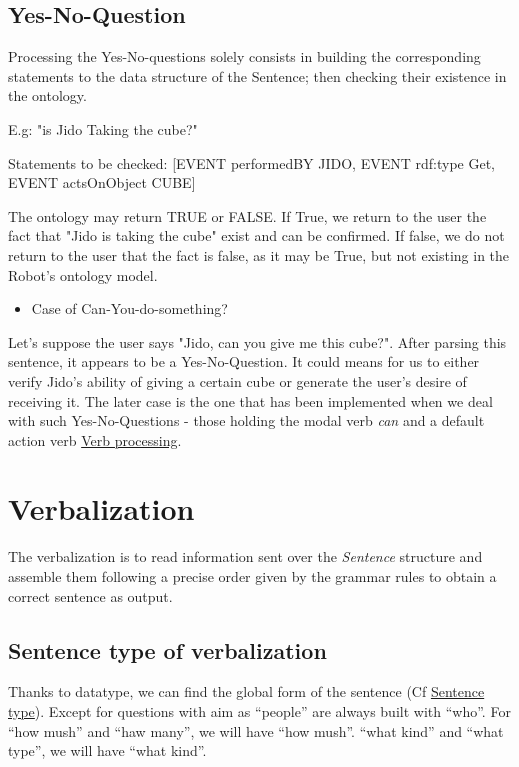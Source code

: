 \documentclass[twoside,a4paper,10pt]{report}
\begin{document}
\subsection{Yes-No-Question}
\label{e6969eb2ee1774772084bddc0430fbd3}%
Processing the Yes-No-questions solely consists in building the corresponding statements to the data structure of the Sentence;
then checking their existence in the ontology. 

E.g: "is Jido Taking the cube?"


\small
\begin{verbatimtab}
  Statements to be checked:
      [EVENT performedBY JIDO,
       EVENT rdf:type Get,
       EVENT actsOnObject CUBE]
\end{verbatimtab}
\normalsize
The ontology may return TRUE or FALSE. If True, we return to the user the fact that "Jido is taking the cube" exist and can be confirmed. If false, we do not return to the user that
the fact is false, as it may be True, but not existing in the Robot's ontology model.



\begin{itemize}
    \item  Case of Can-You-do-something?
\end{itemize}
Let's suppose the user says "Jido, can you give me this cube?". 
After parsing this sentence, it appears to be a Yes-No-Question. It could means for us to either verify Jido's ability of giving a certain cube or generate the user's desire of receiving it.
The later case is the one that has been implemented when we deal with such Yes-No-Questions - those holding the modal verb \textsl{can} and a default action verb \hyperref[d579d8cc3406c0556913bbaac7ee85e6]{Verb processing}.


\section{Verbalization}
\label{8f5fecd7d65dd4b39822e786e6aa17f8}%
The verbalization is to read information sent over the \textsl{Sentence} structure and assemble them following a precise order given by the grammar rules to obtain a correct sentence as output.


\subsection{Sentence type of verbalization}
\label{3932b1b4e5441078c313fdb09ac327bd}%
Thanks to data{\textunderscore}type, we can find the global form of the sentence (Cf \hyperref[1cae782fdfad8b38f1b3641092175803]{Sentence type}). Except for questions with aim as “people” are always built with “who”. For “how mush” and “haw many”, we will have “how mush”. “what kind” and “what type”, we will have “what kind”.
\end{document}
